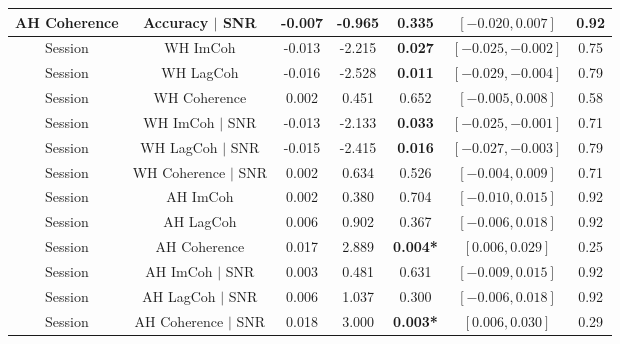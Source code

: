 {\begin{tabular}{ccccccc}
AH Coherence & Accuracy $|$ SNR & -0.007 & -0.965 & 0.335 & $[-0.020, 0.007]$ & 0.92\\
\midrule
Session & WH ImCoh & -0.013 & -2.215 & \textbf{0.027} & $[-0.025,-0.002]$ & 0.75\\
Session & WH LagCoh & -0.016 & -2.528 & \textbf{0.011} & $[-0.029,-0.004]$ & 0.79\\
Session & WH Coherence & 0.002 & 0.451 & 0.652 & $[-0.005, 0.008]$ & 0.58\\
\addlinespace
Session & WH ImCoh $|$ SNR & -0.013 & -2.133 & \textbf{0.033} & $[-0.025,-0.001]$ & 0.71\\
Session & WH LagCoh $|$ SNR & -0.015 & -2.415 & \textbf{0.016} & $[-0.027,-0.003]$ & 0.79\\
Session & WH Coherence $|$ SNR & 0.002 & 0.634 & 0.526 & $[-0.004, 0.009]$ & 0.71\\
\addlinespace
Session & AH ImCoh & 0.002 & 0.380 & 0.704 & $[-0.010, 0.015]$ & 0.92\\
Session & AH LagCoh & 0.006 & 0.902 & 0.367 & $[-0.006, 0.018]$ & 0.92\\
Session & AH Coherence & 0.017 & 2.889 & \textbf{0.004*} & $[ 0.006, 0.029]$ & 0.25\\
\addlinespace
Session & AH ImCoh $|$ SNR & 0.003 & 0.481 & 0.631 & $[-0.009, 0.015]$ & 0.92\\
Session & AH LagCoh $|$ SNR & 0.006 & 1.037 & 0.300 & $[-0.006, 0.018]$ & 0.92\\
Session & AH Coherence $|$ SNR & 0.018 & 3.000 & \textbf{0.003*} & $[ 0.006, 0.030]$ & 0.29\\
\bottomrule
\end{tabular}}
